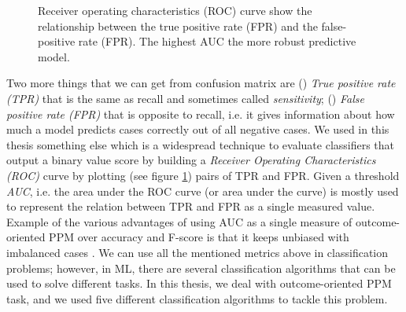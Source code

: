 \begin{figure}[htb]
	\begin{center}
		\caption[ROC curve]{Receiver operating characteristics (ROC) curve show the relationship between the true positive rate (FPR) and the false-positive rate (FPR). The highest AUC the more robust predictive model.}
		\label{fig:roc}
	\end{center}
\end{figure}

Two more things that we can get from confusion matrix are () \textit{True positive rate (TPR)} that is the same as recall and sometimes called \textit{sensitivity}; () \textit{False positive rate (FPR)} that is opposite to recall, i.e. it gives information about how much a model predicts cases correctly out of all negative cases. We used in this thesis something else which is a widespread technique to evaluate classifiers that output a binary value score by building a  \textit{Receiver Operating Characteristics (ROC)} curve by plotting (see figure \ref{fig:roc}) pairs of TPR and FPR. Given a threshold  \textit{AUC}, i.e. the area under the ROC curve (or area under the curve) is mostly used to represent the relation between TPR and FPR as a single measured value. Example of the various advantages of using AUC as a single measure of outcome-oriented PPM over accuracy and F-score is that it keeps unbiased with imbalanced cases \cite{bradley1997use}. We can use all the mentioned metrics above in classification problems; however, in ML, there are several classification algorithms that can be used to solve different tasks. In this thesis, we deal with outcome-oriented PPM task, and we used five different classification algorithms to tackle this problem.




